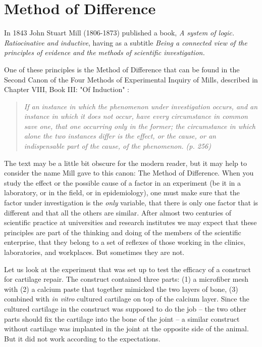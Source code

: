 \documentclass[twocolumn, reflection, authordate,  issue]{jote-new-article}
\begin{document}
\section{Method of Difference} 

In 1843 John Stuart Mill (1806-1873) published a book, \emph{A system of logic. Ratiocinative and inductive}, having as a subtitle \emph{Being a connected view of the principles of evidence and the methods of scientific investigation.}

One of these principles is the Method of Difference that can be found in the Second Canon of the Four Methods of Experimental Inquiry of Mills, described in Chapter VIII, Book III: "Of Induction" \parencite{Mill1884}:
\begin{quote}
\emph{If an instance in which the phenomenon under investigation occurs, and an instance in which it does not occur, have every circumstance in common save one, that one occurring only in the former; the circumstance in which alone the two instances differ is the effect, or the cause, or an indispensable part of the cause, of the phenomenon. (p. 256) 
}\end{quote}
The text may be a little bit obscure for the modern reader, but it may help to consider the name Mill gave to this canon: The Method of Difference. When you study the effect or the possible cause of a factor in an experiment (be it in a laboratory, or in the field, or in epidemiology), one must make sure that the factor under investigation is the \emph{only} variable, that there is only one factor that is different and that all the others are similar. After almost two centuries of scientific practice at universities and research institutes we may expect that these principles are part of the thinking and doing of the members of the scientific enterprise, that they belong to a set of reflexes of those working in the clinics, laboratories, and workplaces. But sometimes they are not.

Let us look at the experiment that was set up to test the efficacy of a construct for cartilage repair. The construct contained three parts: (1) a microfiber mesh with (2) a calcium paste that together mimicked the two layers of bone, (3) combined with \emph{in vitro} cultured cartilage on top of the calcium layer. Since the cultured cartilage in the construct was supposed to do the job -- the two other parts should fix the cartilage into the bone of the joint -- a similar construct without cartilage was implanted in the joint at the opposite side of the animal. But it did not work according to the expectations.
\end{document}
